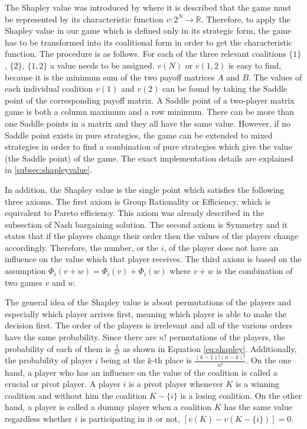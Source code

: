 The Shapley value was introduced by \citet{shapley1952value} where it is described that the game must be represented by its characteristic function $v: 2^N	\rightarrow \mathbb{R}$. Therefore, to apply the Shapley value in our game which is defined only in its strategic form, the game has to be transformed into its coalitional form in order to get the characteristic function. The procedure is as follows. For each of the three relevant coalitions $\{1\}$, $\{2\}$, $\{1,2\}$ a value needs to be assigned. $v(N)$ or $v(1,2)$ is easy to find, because it is the minimum sum of the two payoff matrices $A$ and $B$. The values of each individual coalition $v(1)$ and $v(2)$ can be found by taking the Saddle point of the corresponding payoff matrix. A Saddle point of a two-player matrix game is both a column maximum and a row minimum. There can be more than one Saddle points in a matrix and they all have the same value. However, if no Saddle point exists in pure strategies, the game can be extended to mixed strategies in order to find a combination of pure strategies which give the value (the Saddle point) of the game. The exact implementation details are explained in \ref{subsec:shapleyvalue}.

In addition, the Shapley value is the single point which satisfies the following three axioms. The first axiom is Group Rationality or Efficiency, which is equivalent to Pareto efficiency. This axiom was already described in the subsection of Nash bargaining solution. The second axiom is Symmetry and it states that if the players change their order then the values of the players change accordingly. Therefore, the number, or the $i$, of the player does not have an influence on the value which that player receives. The third axiom is based on the assumption $\Phi_i(v+w) = \Phi_i(v) + \Phi_i(w)$ where $v+w$ is the combination of two games $v$ and $w$.

The general idea of the Shapley value is about permutations of the players and especially which player arrives first, meaning which player is able to make the decision first. The order of the players is irrelevant and all of the various orders have the same probability. Since there are $n!$ permutations of the players, the probability of each of them is $\frac{1}{n!}$ as shown in Equation \ref{eq:shapley}. Additionally, the probability of player $i$ being at the $k$-th place is $\frac{(k-1)!(n-k)!}{n!}$.
On the one hand, a player who has an influence on the value of the coalition is called a crucial or pivot player. A player $i$ is a pivot player whenever $K$ is a winning coalition and without him the coalition $K-\{i\}$ is a losing coalition. On the other hand, a player is called a dummy player when a coalition $K$ has the same value regardless whether $i$ is participating in it or not, $[v(K) - v(K-\{i\})]=0$.